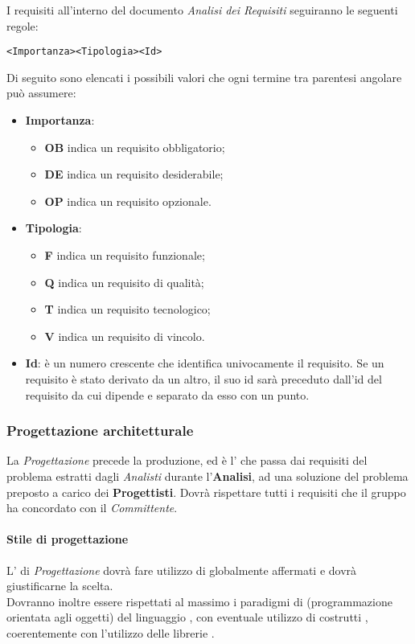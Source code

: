 \documentclass{scalatekids-article}
\begin{document}
\label{sec:adr}
I requisiti all'interno del documento \textit{Analisi dei Requisiti} seguiranno le seguenti regole:
\begin{center}
    \verb=<Importanza><Tipologia><Id>=
\end{center}
Di seguito sono elencati i possibili valori che ogni termine tra parentesi angolare può assumere:
\begin{itemize}
    \item \textbf{Importanza}:
        \begin{itemize}
            \item \textbf{OB} indica un requisito obbligatorio;
            \item \textbf{DE} indica un requisito desiderabile;
            \item \textbf{OP} indica un requisito opzionale.
        \end{itemize}
    \item \textbf{Tipologia}:
        \begin{itemize}
            \item \textbf{F} indica un requisito funzionale;
            \item \textbf{Q} indica un requisito di qualità;
            \item \textbf{T} indica un requisito tecnologico;
            \item \textbf{V} indica un requisito di vincolo.
        \end{itemize}
    \item \textbf{Id}: è un numero crescente che identifica univocamente il requisito. Se un requisito è stato derivato da un altro, il suo id sarà preceduto dall'id del requisito da cui dipende e separato da esso con un punto.
\end{itemize}

\subsubsection{Progettazione architetturale}

La \textit{Progettazione} precede la produzione, ed è l' che
passa dai requisiti del problema estratti dagli \textit{Analisti} durante
l'\textbf{Analisi}, ad una soluzione del problema preposto a carico dei
\textbf{Progettisti}. Dovrà rispettare tutti i requisiti che il gruppo ha
concordato con il \textit{Committente}.
\paragraph{Stile di progettazione}
L' di \textit{Progettazione} dovrà fare utilizzo di
 globalmente affermati e dovrà giustificarne la
scelta.\\Dovranno inoltre essere rispettati al massimo i paradigmi di  (programmazione orientata agli oggetti) del linguaggio , con eventuale utilizzo
di costrutti , coerentemente con l'utilizzo delle librerie
\textit{}.
\end{document}
